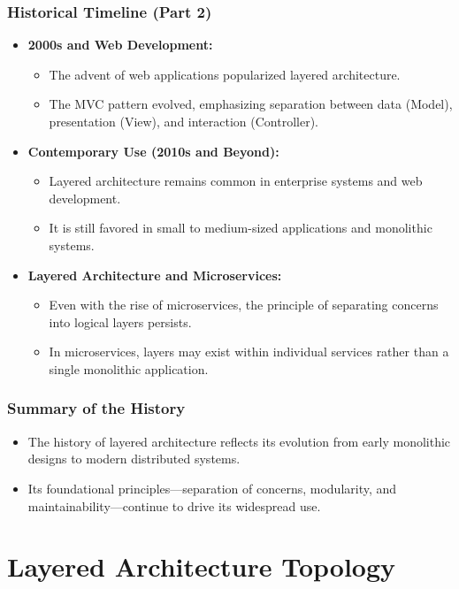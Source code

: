 \documentclass[aspectratio=169, table]{beamer}
\begin{document}
\begin{frame}
	\frametitle{Historical Timeline (Part 2)}
	\begin{itemize}
		\item \textbf{2000s and Web Development:}
		\begin{itemize}
			\item The advent of web applications popularized layered architecture.
			\item The MVC pattern evolved, emphasizing separation between data (Model), presentation (View), and interaction (Controller).
		\end{itemize}
		\item \textbf{Contemporary Use (2010s and Beyond):}
		\begin{itemize}
			\item Layered architecture remains common in enterprise systems and web development.
			\item It is still favored in small to medium-sized applications and monolithic systems.
		\end{itemize}
		\item \textbf{Layered Architecture and Microservices:}
		\begin{itemize}
			\item Even with the rise of microservices, the principle of separating concerns into logical layers persists.
			\item In microservices, layers may exist within individual services rather than a single monolithic application.
		\end{itemize}
	\end{itemize}
\end{frame}


\begin{frame}
	\frametitle{Summary of the History}
	\begin{itemize}
		\item The history of layered architecture reflects its evolution from early monolithic designs to modern distributed systems.
		\item Its foundational principles—separation of concerns, modularity, and maintainability—continue to drive its widespread use.
	\end{itemize}
\end{frame}

\section{Layered Architecture Topology}
\end{document}
